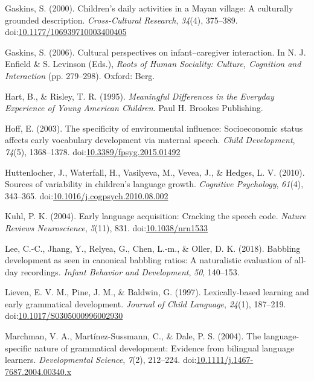 \documentclass[,man,floatsintext]{apa6}
\begin{document}
\hypertarget{ref-gaskins2000childrens}{}
Gaskins, S. (2000). Children's daily activities in a Mayan village: A
culturally grounded description. \emph{Cross-Cultural Research},
\emph{34}(4), 375--389.
doi:\href{https://doi.org/10.1177/106939710003400405}{10.1177/106939710003400405}

\hypertarget{ref-gaskins2006cultural}{}
Gaskins, S. (2006). Cultural perspectives on infant--caregiver
interaction. In N. J. Enfield \& S. Levinson (Eds.), \emph{Roots of
Human Sociality: Culture, Cognition and Interaction} (pp. 279--298).
Oxford: Berg.

\hypertarget{ref-hart1995meaningful}{}
Hart, B., \& Risley, T. R. (1995). \emph{Meaningful Differences in the
Everyday Experience of Young American Children}. Paul H. Brookes
Publishing.

\hypertarget{ref-hoff2003specificity}{}
Hoff, E. (2003). The specificity of environmental influence:
Socioeconomic status affects early vocabulary development via maternal
speech. \emph{Child Development}, \emph{74}(5), 1368--1378.
doi:\href{https://doi.org/10.3389/fpsyg.2015.01492}{10.3389/fpsyg.2015.01492}

\hypertarget{ref-huttenlocher2010sources}{}
Huttenlocher, J., Waterfall, H., Vasilyeva, M., Vevea, J., \& Hedges, L.
V. (2010). Sources of variability in children's language growth.
\emph{Cognitive Psychology}, \emph{61}(4), 343--365.
doi:\href{https://doi.org/10.1016/j.cogpsych.2010.08.002}{10.1016/j.cogpsych.2010.08.002}

\hypertarget{ref-kuhl2004early}{}
Kuhl, P. K. (2004). Early language acquisition: Cracking the speech
code. \emph{Nature Reviews Neuroscience}, \emph{5}(11), 831.
doi:\href{https://doi.org/10.1038/nrn1533}{10.1038/nrn1533}

\hypertarget{ref-lee2018babbling}{}
Lee, C.-C., Jhang, Y., Relyea, G., Chen, L.-m., \& Oller, D. K. (2018).
Babbling development as seen in canonical babbling ratios: A
naturalistic evaluation of all-day recordings. \emph{Infant Behavior and
Development}, \emph{50}, 140--153.

\hypertarget{ref-lieven1997lexically}{}
Lieven, E. V. M., Pine, J. M., \& Baldwin, G. (1997). Lexically-based
learning and early grammatical development. \emph{Journal of Child
Language}, \emph{24}(1), 187--219.
doi:\href{https://doi.org/10.1017/S0305000996002930}{10.1017/S0305000996002930}

\hypertarget{ref-marchman2004language}{}
Marchman, V. A., Martínez-Sussmann, C., \& Dale, P. S. (2004). The
language-specific nature of grammatical development: Evidence from
bilingual language learners. \emph{Developmental Science}, \emph{7}(2),
212--224.
doi:\href{https://doi.org/10.1111/j.1467-7687.2004.00340.x}{10.1111/j.1467-7687.2004.00340.x}
\end{document}
